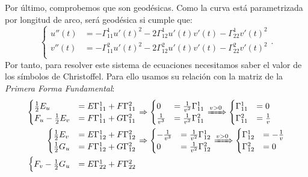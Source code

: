 Por último, comprobemos que son geodésicas. Como la curva está parametrizada por
longitud de arco, será geodésica si cumple que:
\[
\begin{cases}
    u''\left( t \right) &= - \Gamma_{11}^1 u'\left( t \right)^2 - 2 \Gamma_{12}^1
    u'\left( t \right) v'\left( t \right) - \Gamma_{22}^1 v'\left( t \right)^2\\
    v''\left( t \right) &= - \Gamma_{11}^2 u'\left( t \right)^2 - 2 \Gamma_{12}^2
    u'\left( t \right) v'\left( t \right) - \Gamma_{22}^2 v'\left( t \right)^2\\
\end{cases}.
\]
Por tanto, para resolver este sistema de ecuaciones necesitamos saber el valor
de los símbolos de Christoffel. Para ello usamos su relación con la
matriz de la \textit{Primera Forma Fundamental}:
\begin{align*}
    \begin{cases}
        \frac{1}{2} E_u &= E \Gamma_{11}^1 + F \Gamma_{11}^2\\
        F_u - \frac{1}{2} E_v &= F \Gamma_{11}^1 + G \Gamma_{11}^2
    \end{cases} &\Rightarrow \begin{cases}
        0 &= \frac{1}{v^2} \Gamma_{11}^1\\
        \frac{1}{v^3} &= \frac{1}{v^2} \Gamma_{11}^2
        \end{cases} \xRightarrow{v > 0} \begin{cases}
        \Gamma_{11}^1 &= 0\\
        \Gamma_{11}^2 &= \frac{1}{v}
    \end{cases}\\
    \begin{cases}
        \frac{1}{2}E_v &= E \Gamma_{12}^1 + F \Gamma_{12}^2\\
        \frac{1}{2} G_u &= F \Gamma_{12}^1 + G \Gamma_{12}^2
    \end{cases} &\Rightarrow \begin{cases}
        -\frac{1}{v^3} &= \frac{1}{v^2} \Gamma_{12}^1\\
        0 &= \frac{1}{v^2} \Gamma_{12}^2
    \end{cases} \xRightarrow{v > 0} \begin{cases}
        \Gamma_{12}^1 &= -\frac{1}{v}\\
        \Gamma_{12}^2 &= 0
    \end{cases}\\
    \begin{cases}
        F_v - \frac{1}{2} G_u &= E \Gamma_{22}^1 + F \Gamma_{22}^2\\

\end{cases}
\end{align*}
